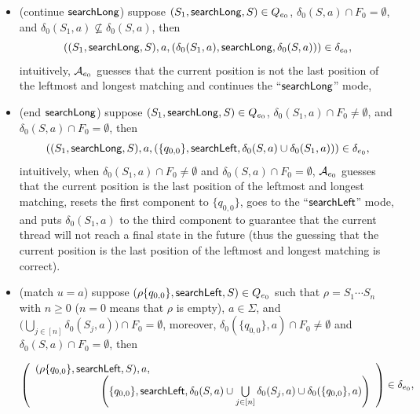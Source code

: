 \begin{itemize}
\begin{itemize}
		\item (continue $\mathsf{searchLong}$) suppose $(S_1, \mathsf{searchLong}, S) \in Q_{e_0}$, $\delta_0(S,a) \cap F_0 = \emptyset$, and $\delta_0(S_1,a) \not \subseteq \delta_0(S,a)$, then 
		$$((S_1, \mathsf{searchLong}, S), a, (\delta_0(S_1,a), \mathsf{searchLong}, \delta_0(S,a))) \in \delta_{e_0},$$
		intuitively, $\mathcal{A}_{e_0}$ guesses that the current position is not the last position of the leftmost and longest matching and continues the ``$\mathsf{searchLong}$'' mode,
		\item (end $\mathsf{searchLong}$) suppose $(S_1, \mathsf{searchLong}, S) \in Q_{e_0}$, $\delta_0(S_1,a) \cap F_0 \neq \emptyset$, and $\delta_0(S,a) \cap F_0 = \emptyset$, then 
		$$((S_1, \mathsf{searchLong}, S), a, (\{q_{0,0}\}, \mathsf{searchLeft}, \delta_0(S,a) \cup \delta_0(S_1,a))) \in \delta_{e_0},$$
		intuitively, when $\delta_0(S_1,a) \cap F_0 \neq \emptyset$ and $\delta_0(S,a) \cap F_0 = \emptyset$, $\mathcal{A}_{e_0}$ guesses that the current position is the last position of the leftmost and longest matching, resets the first component to $\{q_{0,0}\}$, goes to the ``$\mathsf{searchLeft}$'' mode, and puts $\delta_0(S_1, a)$ to the third component to guarantee that the current thread will not reach a final state in the future (thus the guessing that the current position is the last position of the leftmost and longest matching is correct).
		\item (match $u = a$) suppose $(\rho \{q_{0,0}\}, \mathsf{searchLeft}, S) \in Q_{e_0}$ such that $\rho = S_1 \cdots S_n$ with $n \ge 0$ ($n = 0$ means that $\rho$ is empty),  $a \in \Sigma$, and $\big(\bigcup \limits_{j \in [n]} \delta_0(S_j, a) \big) \cap F_0 = \emptyset$, moreover, $\delta_0(\{q_{0,0}\}, a) \cap F_0 \neq \emptyset$ and $\delta_0(S,a) \cap F_0 = \emptyset$, then
		
		\medskip
		$\left(
		\begin{array}{l l}
		(\rho \{q_{0,0}\}, \searchleft, S), a, &\\
		& \hspace{-2cm} \left(\{q_{0,0}\}, \searchleft, \delta_0(S,a) \cup \bigcup \limits_{j \in [n]} \delta_0(S_j, a) \cup \delta_0(\{q_{0,0}\}, a) \right)
		\end{array}
		\right) \in \delta_{e_0},$
		

\end{itemize}
\end{itemize}
